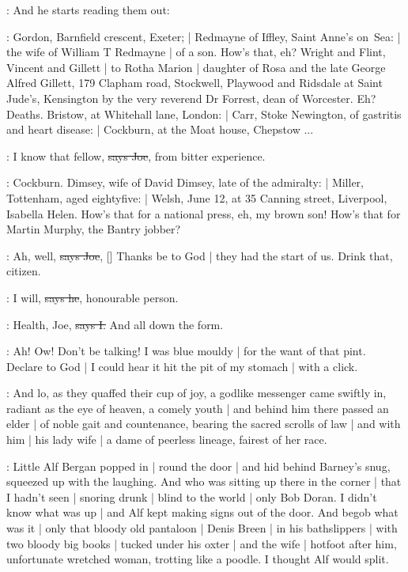 \Nq:
And he starts reading them out:

\citizen:
Gordon,
Barnfield crescent,
Exeter; |
Redmayne of Iffley,
Saint Anne's on~Sea: |
the wife of William T Redmayne |
of a son.
How's that,
eh?
Wright and Flint,
Vincent and Gillett |
to Rotha Marion |
daughter of Rosa and the late George Alfred Gillett,
179 Clapham road,
Stockwell,
Playwood and Ridsdale at Saint Jude's,
Kensington by the very reverend Dr Forrest,
dean of Worcester.
Eh?
Deaths.
Bristow,
at Whitehall lane,
London: |
Carr,
Stoke Newington,
of gastritis and heart disease: |
Cockburn,
at the Moat house,
Chepstow ...

\joe:
I know that fellow,
\sout{says Joe},
from bitter experience.

\citizen:
Cockburn.
Dimsey,
wife of David Dimsey,
late of the admiralty: |
Miller,
Tottenham,
aged eightyfive: |
Welsh,
June 12,
at 35 Canning street,
Liverpool,
Isabella Helen.
How's that for a national press,
eh,
my brown son!
How's that for Martin Murphy,
the Bantry jobber?

\joe:
Ah, well,
\sout{says Joe},
[]
Thanks be to God |
they had the start of us.
Drink that,
citizen.

\citizen:
I will,
\sout{says he},
honourable person.

:
Health,
Joe,
\sout{says I.}
And all down the form.

\Nq:
Ah!
Ow!
Don't be talking!
I was blue mouldy |
for the want of that pint.
Declare to God |
I could hear it hit the pit of my stomach |
with a click.

:
And lo,
as they quaffed their cup of joy,
a godlike messenger came swiftly in,
radiant as the eye of heaven,
a comely youth |
and behind him
there passed an elder |
of noble gait and countenance,
bearing the sacred scrolls of law |
and with him |
his lady wife |
a dame of peerless lineage,
fairest of her race.

\Nq:
Little Alf Bergan popped in |
round the door |
and hid behind Barney's snug,
squeezed up with the laughing.
And who was sitting up there in the corner |
that I hadn't seen |
snoring drunk |
blind to the world |
only Bob Doran.
I didn't know what was up |
and Alf kept making signs out of the door.
And begob what was it |
only that bloody old pantaloon |
Denis Breen |
in his bathslippers |
with two bloody big books |
tucked under his oxter |
and the wife |
hotfoot after him,
unfortunate wretched woman,
trotting like a poodle.
I thought Alf would split.

